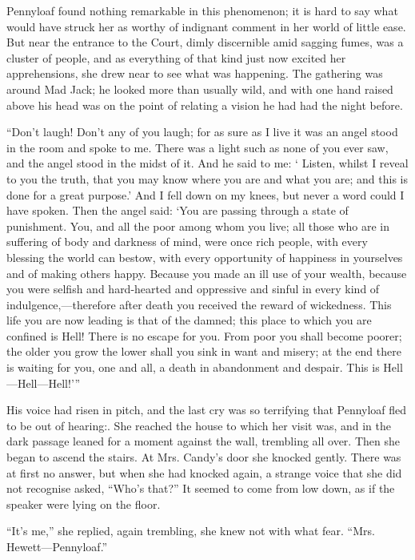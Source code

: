 Pennyloaf found nothing remarkable in this phenomenon; it is hard to say
what would have struck her as worthy of indignant comment in her world
of little ease. But near the entrance to the Court, dimly discernible
amid sagging fumes, was a cluster of people, and as everything of that
kind just now excited her apprehensions, she drew near to see what was
happening. The gathering was around Mad Jack; he looked more than
usually wild, and with one hand raised above his head was
{\protect\hypertarget{211}{}{}}on the point of relating a vision he had
had the night before.

``Don't laugh! Don't any of you laugh; for as sure as I live it was an
angel stood in the room and spoke to me. There was a light such as none
of you ever saw, and the angel stood in the midst of it. And he said to
me: ` Listen, whilst I reveal to you the truth, that you may know where
you are and what you are; and this is done for a great purpose.' And I
fell down on my knees, but never a word could I have spoken. Then the
angel said: `You are passing through a state of punishment. You, and all
the poor among whom you live; all those who are in suffering of body and
darkness of mind, were once rich people, with every blessing the world
can bestow, with every opportunity of happiness in yourselves and of
making others happy. Because you made an ill use of your wealth, because
you were selfish and hard-hearted and oppressive and sinful in every
kind of indulgence,---therefore after death you received the reward of
wickedness. This life you are now leading is that of the damned; this
place to which you are confined is Hell! There is no escape for
{\protect\hypertarget{212}{}{}}you. From poor you shall become poorer;
the older you grow the lower shall you sink in want and misery; at the
end there is waiting for you, one and all, a death in abandonment and
despair. This is Hell---Hell---Hell!'''

His voice had risen in pitch, and the last cry was so terrifying that
Pennyloaf fled to be out of hearing:. She reached the house to which her
visit was, and in the dark passage leaned for a moment against the wall,
trembling all over. Then she began to ascend the stairs. At Mrs. Candy's
door she knocked gently. There was at first no answer, but when she had
knocked again, a strange voice that she did not recognise asked, ``Who's
that?'' It seemed to come from low down, as if the speaker were lying on
the floor.

``It's me,'' she replied, again trembling, she knew not with what fear.
``Mrs. Hewett---Pennyloaf.''

